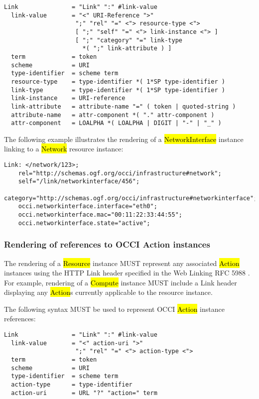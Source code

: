 \documentclass[10pt,a4paper]{article}
\begin{document}
\begin{verbatim}
Link               = "Link" ":" #link-value
  link-value       = "<" URI-Reference ">"
                    ";" "rel" "=" <"> resource-type <">
                    [ ";" "self" "=" <"> link-instance <"> ]
                    [ ";" "category" "=" link-type
                      *( ";" link-attribute ) ]
  term             = token
  scheme           = URI
  type-identifier  = scheme term
  resource-type    = type-identifier *( 1*SP type-identifier )
  link-type        = type-identifier *( 1*SP type-identifier )
  link-instance    = URI-reference
  link-attribute   = attribute-name "=" ( token | quoted-string )
  attribute-name   = attr-component *( "." attr-component )
  attr-component   = LOALPHA *( LOALPHA | DIGIT | "-" | "_" )
\end{verbatim}

The following example illustrates the rendering of a
\hl{NetworkInterface} \cite{occi:infrastructure} instance linking to a
\hl{Network} resource instance:

\begin{verbatim}
Link: </network/123>;
    rel="http://schemas.ogf.org/occi/infrastructure#network";
    self="/link/networkinterface/456";
    category="http://schemas.ogf.org/occi/infrastructure#networkinterface";
    occi.networkinterface.interface="eth0";
    occi.networkinterface.mac="00:11:22:33:44:55";
    occi.networkinterface.state="active";
\end{verbatim}

\subsubsection{Rendering of references to OCCI Action instances}
The rendering of a \hl{Resource} instance \cite{occi:core} MUST
represent any associated \hl{Action} instances using the HTTP Link
header specified in the Web Linking RFC 5988 \cite{rfc5988}.  For
example, rendering of a \hl{Compute} instance MUST include a Link
header displaying any \hl{Action}s currently applicable to the
resource instance.

The following syntax MUST be used to represent OCCI \hl{Action}
instance references:

\begin{verbatim}
Link               = "Link" ":" #link-value
  link-value       = "<" action-uri ">"
                    ";" "rel" "=" <"> action-type <">
  term             = token
  scheme           = URI
  type-identifier  = scheme term
  action-type      = type-identifier
  action-uri       = URL "?" "action=" term
\end{verbatim}
\end{document}
